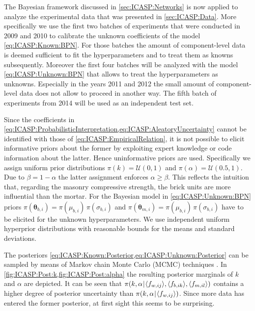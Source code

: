 The Bayesian framework discussed in \cref{sec:ICASP:Networks} is now applied to analyze the experimental data that was presented in \cref{sec:ICASP:Data}.
More specifically we use the first two batches of experiments that were conducted in 2009 and 2010 to calibrate the unknown coefficients of the model \cref{eq:ICASP:Known:BPN}.
For those batches the amount of component-level data is deemed sufficient to fit the hyperparameters and to treat them as knowns subsequently.
Moreover the first four batches will be analyzed with the model \cref{eq:ICASP:Unknown:BPN} that allows to treat the hyperparameters as unknowns.
Especially in the years 2011 and 2012 the small amount of component-level data does not allow to proceed in another way.
The fifth batch of experiments from 2014 will be used as an independent test set.
\par %
Since the coefficients in \cref{eq:ICASP:ProbabilisticInterpretation,eq:ICASP:AleatoryUncertainty} cannot be identified with those of \cref{eq:ICASP:EmpiricalRelation},
it is not possible to elicit informative priors about the former by exploiting expert knowledge or code information about the latter.
Hence uninformative priors are used.
Specifically we assign uniform prior distributions \(\pi(k) = \mathcal{U}(0,1)\) and \(\pi(\alpha) = \mathcal{U}(0.5,1)\).
Due to \(\beta=1-\alpha\) the latter assignment enforces \(\alpha \geq \beta\).
This reflects the intuition that, regarding the masonry compressive strength, the brick units are more influential than the mortar.
For the Bayesian model in \cref{eq:ICASP:Unknown:BPN} priors \(\pi(\bm{\theta}_{b,i}) = \pi(\mu_{b,i}) \, \pi(\sigma_{b,i})\) and \(\pi(\bm{\theta}_{m,i}) = \pi(\mu_{b,i}) \, \pi(\sigma_{b,i})\)
have to be elicited for the unknown hyperparameters.
We use independent uniform hyperprior distributions with reasonable bounds for the means and standard deviations.
\par %
The posteriors \cref{eq:ICASP:Known:Posterior,eq:ICASP:Unknown:Posterior} can be sampled by means of Markov chain Monte Carlo (MCMC) techniques \cite{MCMC:Brooks2011}.
In \cref{fig:ICASP:Post:k,fig:ICASP:Post:alpha} the resulting posterior marginals of \(k\) and \(\alpha\) are depicted.
It can be seen that \(\pi(k,\alpha {\:\!}|{\:\!} \langle{f_{w,ij}}\rangle,\langle{f_{b,ik}}\rangle,\langle{f_{m,il}}\rangle)\) contains a higher degree of posterior uncertainty than \(\pi(k,\alpha {\:\!}|{\:\!} \langle{f_{w,ij}}\rangle)\).
Since more data has entered the former posterior, at first sight this seems to be surprising.
